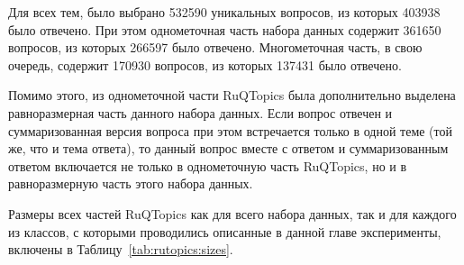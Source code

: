 Для всех тем, было выбрано 532590 уникальных вопросов, из которых 403938 было отвечено. При этом однометочная часть набора данных содержит 361650 вопросов, из которых 266597 было отвечено. Многометочная часть, в свою очередь, содержит 170930 вопросов, из которых 137431 было отвечено.

Помимо этого, из однометочной части {RuQTopics} была дополнительно выделена равноразмерная часть данного набора данных. Если вопрос отвечен и суммаризованная версия вопроса при этом встречается только в одной теме (той же, что и тема ответа), то данный вопрос вместе с ответом и суммаризованным ответом включается не только в однометочную часть {RuQTopics}, но и в равноразмерную часть этого набора данных.
 
Размеры всех частей {RuQTopics} как для всего набора данных, так и для каждого из классов, с которыми проводились описанные в данной главе эксперименты, включены в Таблицу~\ref{tab:rutopics:sizes}.

\begin{table*}
\centering
{}
\caption{Размеры набора данных {RuQTopics} по классу и части}
\label{tab:rutopics:sizes}
\end{table*}


